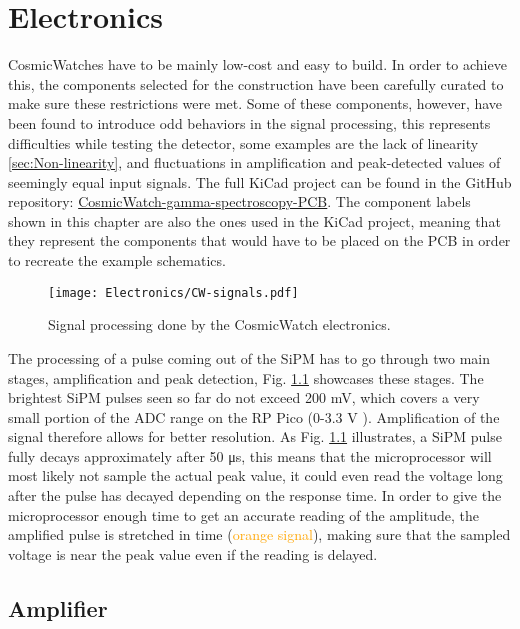 \chapter{Electronics}
\label{chap:Electronics}

CosmicWatches have to be mainly low-cost and easy to build. In order to achieve this, the components selected for the construction have been carefully curated to make sure these restrictions were met. Some of these components, however, have been found to introduce odd behaviors in the signal processing, this represents difficulties while testing the detector, some examples are the lack of linearity \ref{sec:Non-linearity}, and fluctuations in amplification and peak-detected values of seemingly equal input signals. The full KiCad project can be found in the GitHub repository: \href{https://github.com/anvargasl/CosmicWatch-gamma-spectroscopy-PCB}{CosmicWatch-gamma-spectroscopy-PCB}. The component labels shown in this chapter are also the ones used in the KiCad project, meaning that they represent the components that would have to be placed on the PCB in order to recreate the example schematics.

\begin{figure}[H]
    \centering
    \texttt{[image: Electronics/CW-signals.pdf]}
    \caption{Signal processing done by the CosmicWatch electronics.}
    \label{fig:signal_processing}
\end{figure}

The processing of a pulse coming out of the SiPM has to go through two main stages, amplification and peak detection, Fig. \ref{fig:signal_processing} showcases these stages. The brightest SiPM pulses seen so far do not exceed 200 mV, which covers a very small portion of the ADC range on the RP Pico (0-3.3 V \cite[p.~18]{datasheet2024RpPico}). Amplification of the signal therefore allows for better resolution. As Fig. \ref{fig:signal_processing} illustrates, a SiPM pulse fully decays approximately after 50 \unit{\micro\s}, this means that the microprocessor will most likely not sample the actual peak value, it could even read the voltage long after the pulse has decayed depending on the response time. In order to give the microprocessor enough time to get an accurate reading of the amplitude, the amplified pulse is stretched in time (\textcolor{orange}{orange signal}), making sure that the sampled voltage is near the peak value even if the reading is delayed.

\section{Amplifier}

